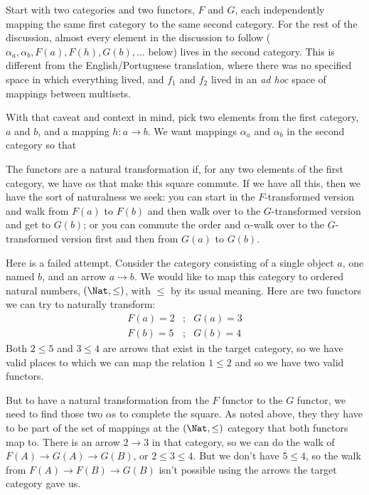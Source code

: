 \documentclass[11pt]{article}
\begin{document}
Start with two categories and two functors, $F$ and $G$, each independently mapping the same first
category to the same second category. For the rest of the discussion, almost every element in the discussion
to follow ($\alpha_a, \alpha_b, F(a), F(h), G(b), \dots$ below) lives in the second category.
This is different from the English/Portuguese translation, where there was no specified
space in which everything lived, and $f_1$ and $f_2$ lived in an {\em ad hoc} space of
mappings between multisets.

With that caveat and context in mind, pick two elements from the first category, $a$
and $b$, and a mapping $h:a\to b$.  We want mappings $\alpha_a$ and $\alpha_b$ in the
second category so that


The functors are a natural transformation if, for any two elements of the first category,
we have $\alpha$s that make this square commute.
 If we have all this, then we have the sort of naturalness we seek: you can
start in the $F$-transformed version and walk from $F(a)$ to $F(b)$ and then walk over to
the $G$-transformed version and get to $G(b)$; or you can commute the order and
$\alpha$-walk over to the $G$-transformed version first and then from $G(a)$ to $G(b)$.

Here is a failed attempt.
Consider the category consisting of a single object $a$, one named $b$, and an arrow $a\to
b$. We would like to map this category to ordered natural numbers, $(\Nat, \leq)$, with
$\leq$ by its usual meaning. Here are two functors we can try to naturally transform:
\begin{eqnarray*}
    F(a) = 2 &;& G(a) = 3\\
    F(b) = 5 &;& G(b) = 4
\end{eqnarray*} 
Both $2 \leq 5$ and $3 \leq 4$ are arrows that exist in the target category, so we have
valid places to which we can map the relation $1\leq 2$ and so we have two valid functors.

But to have a natural transformation from the $F$ functor to the $G$ functor, we need
to find those two $\alpha$s to complete the square. As noted above, they
they have to be part of the set of mappings at the $(\Nat, \leq)$ category that both
functors map to. There is an arrow $2\to 3$ in that category, so we can do the walk
of $F(A) \to G(A) \to G(B)$, or $2 \leq 3 \leq 4$.  But we don't have $5\leq 4$,
so the walk from $F(A)\to F(B) \to G(B)$ isn't possible using the arrows the target
category gave us.
\end{document}
